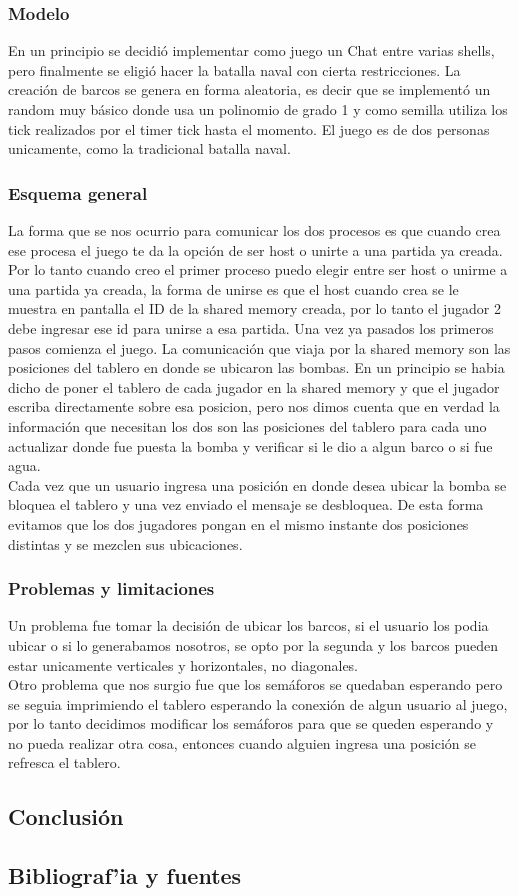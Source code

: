 \documentclass[10pt,a4paper]{article}
\begin{document}
	\subsubsection{Modelo}
		En un principio se decidi\'o implementar como juego un Chat entre varias shells, pero finalmente se eligi\'o hacer la batalla naval con cierta restricciones. La creaci\'on de barcos se genera en forma aleatoria, es decir que se implement\'o un random muy b\'asico donde usa un polinomio de grado 1 y como semilla utiliza los tick realizados por el timer tick hasta el momento. El juego es de dos personas unicamente, como la tradicional batalla naval.
	\subsubsection{Esquema general}
		La forma que se nos ocurrio para comunicar los dos procesos es que cuando crea ese procesa el juego te da la opci\'on de ser host o unirte a una partida ya creada. Por lo tanto cuando creo el primer proceso puedo elegir entre ser host o unirme a una partida ya creada, la forma de unirse es que el host cuando crea se le muestra en pantalla el ID de la shared memory creada, por lo tanto el jugador 2 debe ingresar ese id para unirse a esa partida. Una vez ya pasados los primeros pasos comienza el juego. La comunicaci\'on que viaja por la shared memory son las posiciones del tablero en donde se ubicaron las bombas. En un principio se habia dicho de poner el tablero de cada jugador en la shared memory y que el jugador escriba directamente sobre esa posicion, pero nos dimos cuenta que en verdad la informaci\'on que necesitan los dos son las posiciones del tablero para cada uno actualizar donde fue puesta la bomba y verificar si le dio a algun barco o si fue agua. \\
		Cada vez que un usuario ingresa una posici\'on en donde desea ubicar la bomba se bloquea el tablero y una vez enviado el mensaje se desbloquea. De esta forma evitamos que los dos jugadores pongan en el mismo instante dos posiciones distintas y se mezclen sus ubicaciones.
	\subsubsection{Problemas y limitaciones}
		Un problema fue tomar la decisi\'on de ubicar los barcos, si el usuario los podia ubicar o si lo generabamos nosotros, se opto por la segunda y los barcos pueden estar unicamente verticales y horizontales, no diagonales. \\
		Otro problema que nos surgio fue que los sem\'aforos se quedaban esperando pero se seguia imprimiendo el tablero esperando la conexi\'on de algun usuario al juego, por lo tanto decidimos modificar los sem\'aforos para que se queden esperando y no pueda realizar otra cosa, entonces cuando alguien ingresa una posici\'on se refresca el tablero.  

\subsection{Conclusi\'on}

\subsection{Bibliograf'ia y fuentes}
\end{document}
